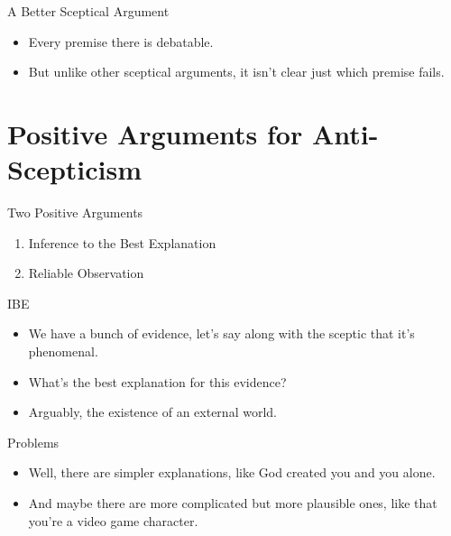 \documentclass[
  17pt,
  letterpaper,
  ignorenonframetext,
  aspectratio=169,
  handout]{beamer}
\providecommand{\tightlist}{%
  \setlength{\itemsep}{0pt}\setlength{\parskip}{0pt}}\usepackage{longtable,booktabs,array}
\begin{document}
\begin{frame}{A Better Sceptical Argument}
\protect\hypertarget{a-better-sceptical-argument-1}{}
\begin{itemize}[<+->]
\tightlist
\item
  Every premise there is debatable.
\item
  But unlike other sceptical arguments, it isn't clear just which
  premise fails.
\end{itemize}
\end{frame}

\hypertarget{positive-arguments-for-anti-scepticism}{%
\section{Positive Arguments for
Anti-Scepticism}\label{positive-arguments-for-anti-scepticism}}

\begin{frame}{Two Positive Arguments}
\protect\hypertarget{two-positive-arguments}{}
\begin{enumerate}[<+->]
\tightlist
\item
  Inference to the Best Explanation
\item
  Reliable Observation
\end{enumerate}
\end{frame}

\begin{frame}{IBE}
\protect\hypertarget{ibe}{}
\begin{itemize}[<+->]
\tightlist
\item
  We have a bunch of evidence, let's say along with the sceptic that
  it's phenomenal.
\item
  What's the best explanation for this evidence?
\item
  Arguably, the existence of an external world.
\end{itemize}
\end{frame}

\begin{frame}{Problems}
\protect\hypertarget{problems}{}
\begin{itemize}[<+->]
\tightlist
\item
  Well, there are simpler explanations, like God created you and you
  alone.
\item
  And maybe there are more complicated but more plausible ones, like
  that you're a video game character.
\end{itemize}
\end{frame}
\end{document}
